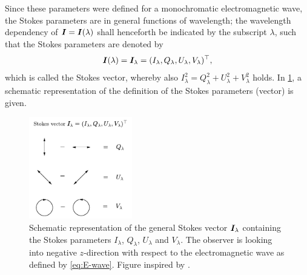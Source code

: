 \documentclass[a4paper,12pt]{report}
\begin{document}
\begin{align}
\begin{aligned}
\end{aligned}
\end{align} Since these parameters were defined for a monochromatic electromagnetic wave, the Stokes parameters are in general functions of wavelength; the wavelength dependency of $\bm{I} = \bm{I}(\lambda)$ shall henceforth be indicated by the subscript $\lambda$, such that the Stokes parameters are denoted by \begin{equation}
\bm{I}(\lambda) = \bm{I}_\lambda = (I_\lambda, Q_\lambda, U_\lambda, V_\lambda)^\top,
\end{equation} which is called the Stokes vector, whereby also $I_\lambda^2 = Q_\lambda^2 + U_\lambda^2 + V_\lambda^2$ holds. In \cref{fig:stokesvector}, a schematic representation of the definition of the Stokes parameters (vector) is given.
\begin{figure}[h]
\centering
\includegraphics[width=4.5cm]{figures/stokesvector.pdf}
\caption{Schematic representation of the general Stokes vector $\bm{I}_\lambda$ containing the Stokes parameters $I_\lambda$, $Q_\lambda$, $U_\lambda$ and $V_\lambda$. The observer is looking into negative $z$-direction with respect to the electromagnetic wave as defined by \cref{eq:E-wave}. Figure inspired by \cite[p.17]{DeglInnocenti.2005}.}
\label{fig:stokesvector}
\end{figure}
\end{document}
